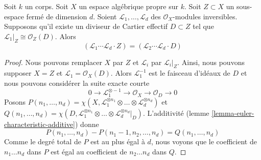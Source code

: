 \begin{lemma}
\label{lemma-numerical-intersection-effective-Cartier-divisor}
Soit $k$ un corps. Soit $X$ un espace algébrique propre sur $k$.
Soit $Z \subset X$ un sous-espace fermé de dimension $d$.
Soient $\mathcal{L}_1, \ldots, \mathcal{L}_d$
des $\mathcal{O}_X$-modules inversibles. Supposons qu'il existe un
diviseur de Cartier effectif $D \subset Z$ tel que
$\mathcal{L}_1|_Z \cong \mathcal{O}_Z(D)$. Alors
$$
(\mathcal{L}_1 \cdots \mathcal{L}_d \cdot Z) =
(\mathcal{L}_2 \cdots \mathcal{L}_d \cdot D)
$$
\end{lemma}

\begin{proof}
Nous pouvons remplacer $X$ par $Z$ et $\mathcal{L}_i$ par $\mathcal{L}_i|_Z$.
Ainsi, nous pouvons supposer $X = Z$ et $\mathcal{L}_1 = \mathcal{O}_X(D)$.
Alors $\mathcal{L}_1^{-1}$ est le faisceau d'idéaux de $D$ et nous pouvons
considérer la suite exacte courte
$$
0 \to \mathcal{L}_1^{\otimes -1} \to \mathcal{O}_X \to \mathcal{O}_D \to 0
$$
Posons
$P(n_1, \ldots, n_d) =
\chi(X, \mathcal{L}_1^{\otimes n_1} \otimes \ldots \otimes
\mathcal{L}_d^{\otimes n_d})$
et
$Q(n_1, \ldots, n_d) =
\chi(D, \mathcal{L}_1^{\otimes n_1} \otimes \ldots \otimes
\mathcal{L}_d^{\otimes n_d}|_D)$.
L'additivité
(lemme \ref{lemma-euler-characteristic-additive})
donne
$$
P(n_1, \ldots, n_d) - P(n_1 - 1, n_2, \ldots, n_d) =
Q(n_1, \ldots, n_d)
$$
Comme le degré total de $P$ est au plus égal à $d$, nous voyons que
le coefficient de $n_1 \ldots n_d$ dans $P$ est égal au coefficient
de $n_2 \ldots n_d$ dans $Q$.
\end{proof}














